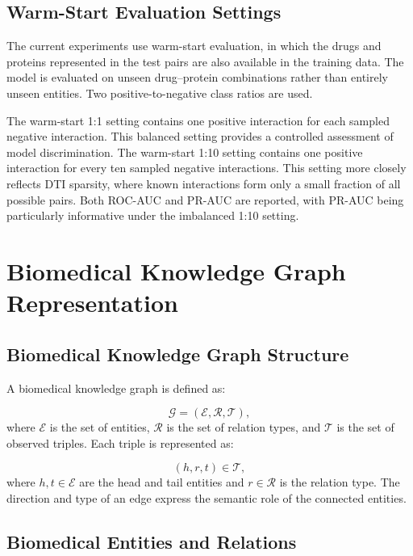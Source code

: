 \subsection{Warm-Start Evaluation Settings}

The current experiments use warm-start evaluation, in which the drugs and
proteins represented in the test pairs are also available in the training
data. The model is evaluated on unseen drug--protein combinations rather than
entirely unseen entities. Two positive-to-negative class ratios are used.

The warm-start 1:1 setting contains one positive interaction for each sampled
negative interaction. This balanced setting provides a controlled assessment
of model discrimination. The warm-start 1:10 setting contains one positive
interaction for every ten sampled negative interactions. This setting more
closely reflects DTI sparsity, where known interactions form only a small
fraction of all possible pairs. Both ROC-AUC and PR-AUC are reported, with
PR-AUC being particularly informative under the imbalanced 1:10 setting.

\section{Biomedical Knowledge Graph Representation}

\subsection{Biomedical Knowledge Graph Structure}

A biomedical knowledge graph is defined as:

\begin{equation}
    \mathcal{G}
    =
    (\mathcal{E},\mathcal{R},\mathcal{T}),
\end{equation}
where $\mathcal{E}$ is the set of entities, $\mathcal{R}$ is the set of
relation types, and $\mathcal{T}$ is the set of observed triples. Each triple
is represented as:

\begin{equation}
    (h,r,t) \in \mathcal{T},
\end{equation}
where $h,t\in\mathcal{E}$ are the head and tail entities and
$r\in\mathcal{R}$ is the relation type. The direction and type of an edge
express the semantic role of the connected entities.

\subsection{Biomedical Entities and Relations}

